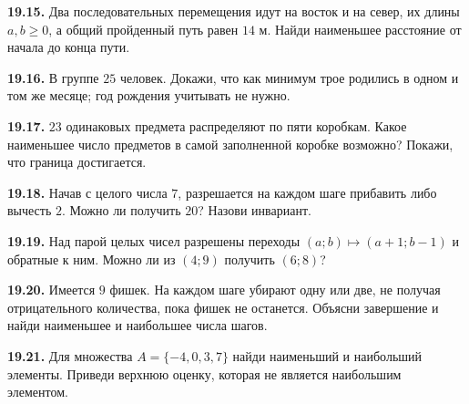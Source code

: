 \noindent\begin{minipage}[t]{\linewidth}\textbf{19.15.} Два последовательных перемещения идут на восток и на север, их длины \(a,b\ge0\), а общий пройденный путь равен \(14\) м. Найди наименьшее расстояние от начала до конца пути.\par\end{minipage}\par
\noindent\begin{minipage}[t]{\linewidth}\textbf{19.16.} В группе \(25\) человек. Докажи, что как минимум трое родились в одном и том же месяце; год рождения учитывать не нужно.\par\end{minipage}\par
\noindent\begin{minipage}[t]{\linewidth}\textbf{19.17.} \(23\) одинаковых предмета распределяют по пяти коробкам. Какое наименьшее число предметов в самой заполненной коробке возможно? Покажи, что граница достигается.\par\end{minipage}\par
\noindent\begin{minipage}[t]{\linewidth}\textbf{19.18.} Начав с целого числа \(7\), разрешается на каждом шаге прибавить либо вычесть \(2\). Можно ли получить \(20\)? Назови инвариант.\par\end{minipage}\par
\noindent\begin{minipage}[t]{\linewidth}\textbf{19.19.} Над парой целых чисел разрешены переходы \((a;b)\mapsto(a+1;b-1)\) и обратные к ним. Можно ли из \((4;9)\) получить \((6;8)\)?\par\end{minipage}\par
\noindent\begin{minipage}[t]{\linewidth}\textbf{19.20.} Имеется \(9\) фишек. На каждом шаге убирают одну или две, не получая отрицательного количества, пока фишек не останется. Объясни завершение и найди наименьшее и наибольшее числа шагов.\par\end{minipage}\par
\noindent\begin{minipage}[t]{\linewidth}\textbf{19.21.} Для множества \(A=\{-4,0,3,7\}\) найди наименьший и наибольший элементы. Приведи верхнюю оценку, которая не является наибольшим элементом.\par\end{minipage}\par
